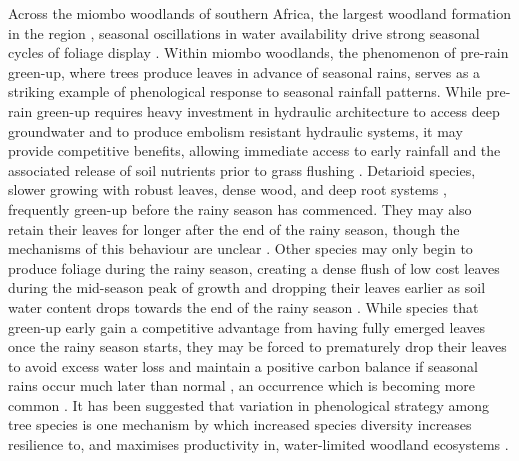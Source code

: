 \documentclass[11pt,a4paper]{article}
\begin{document}
Across the miombo woodlands of southern Africa, the largest woodland formation
in the region \citep{White1983}, seasonal oscillations in water availability
drive strong seasonal cycles of foliage display \citep{Chidumayo2001,
Dahlin2016}. Within miombo woodlands, the phenomenon of pre-rain green-up,
where trees produce leaves in advance of seasonal rains, serves as a striking
example of phenological response to seasonal rainfall patterns. While pre-rain
green-up requires heavy investment in hydraulic architecture to access deep
groundwater and to produce embolism resistant hydraulic systems, it may provide
competitive benefits, allowing immediate access to early rainfall and the
associated release of soil nutrients prior to grass flushing \citep{Ryan2017,
February2016}. Detarioid species, slower growing with robust leaves, dense
wood, and deep root systems \citep{Zhou2020, Timberlake1993}, frequently
green-up before the rainy season has commenced. They may also retain their
leaves for longer after the end of the rainy season, though the mechanisms of
this behaviour are unclear \citep{Giraldo2011, Kushwaha2011}. Other species may
only begin to produce foliage during the rainy season, creating a dense flush
of low cost leaves during the mid-season peak of growth and dropping their
leaves earlier as soil water content drops towards the end of the rainy season
\citep{Lasky2016}. While species that green-up early gain a competitive
advantage from having fully emerged leaves once the rainy season starts, they
may be forced to prematurely drop their leaves to avoid excess water loss and
maintain a positive carbon balance if seasonal rains occur much later than
normal \citep{Vinya2018}, an occurrence which is becoming more common
\citep{Wainwright2021}. It has been suggested that variation in phenological
strategy among tree species is one mechanism by which increased species
diversity increases resilience to, and maximises productivity in, water-limited
woodland ecosystems \citep{Stan2019, Morellato2016}. 
\end{document}
